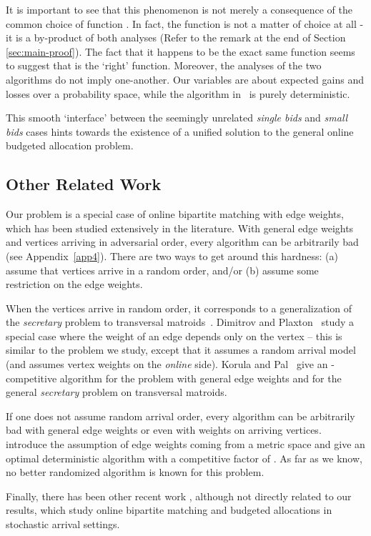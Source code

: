 \documentclass[11pt]{article}
\begin{document}
It is important to see that this phenomenon is not merely a
consequence of the common choice of function . In fact, the
function  is not a matter of choice at all - it is a by-product
of both analyses (Refer to the remark at the end of Section
\ref{sec:main-proof}). The fact that it happens to be the exact same
function seems to suggest that  is the `right'
function. Moreover, the analyses of the two algorithms do not imply
one-another. Our variables are about expected gains and losses over a
probability space, while the algorithm in~\cite{MSVV05} is purely
deterministic.

This smooth `interface' between the seemingly unrelated \emph{single bids} and \emph{small bids} cases hints towards the existence of a unified solution to the general online budgeted allocation problem.

\subsection{Other Related Work}\label{related_work}
Our problem is a special case of online bipartite matching with edge
weights, which has been studied extensively in the literature. With
general edge weights and vertices arriving in adversarial order, every
algorithm can be arbitrarily bad (see Appendix~\ref{app4}). There are two ways to
get around this hardness: (a) assume that vertices arrive in a random
order, and/or (b) assume some restriction on the edge weights.

When the vertices arrive in random order, it corresponds to a
generalization of the {\em secretary} problem to transversal
matroids~\cite{BIK07}. Dimitrov and Plaxton~\cite{DP08} study a
special case where the weight of an edge  depends only on the
vertex  -- this is similar to the problem we study, except that it
assumes a random arrival model (and assumes vertex weights on the {\em
  online} side). Korula and Pal~\cite{KP09} give an
-competitive algorithm for the problem with general edge
weights and for the general {\em secretary} problem on transversal
matroids.

If one does not assume random arrival order, every algorithm
can be arbitrarily bad with general edge weights or even with weights
on arriving vertices. ~\cite{KP93} introduce the assumption of edge
weights coming from a metric space and give an optimal deterministic
algorithm with a competitive factor of . As far as we
know, no better randomized algorithm is known for this problem.

Finally, there has been other recent work \cite{DH09,GM08,FMMM09}, although
not directly related to our results, which study online bipartite
matching and budgeted allocations in stochastic arrival settings.\\
\end{document}

